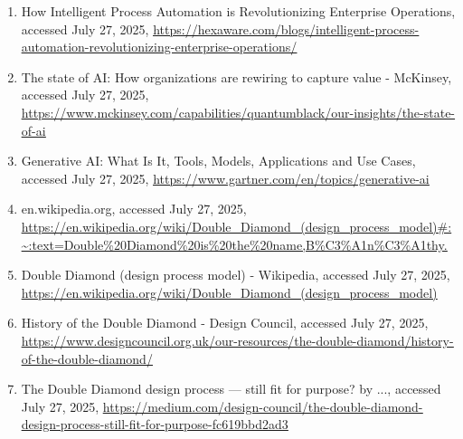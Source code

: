 \documentclass[
  12pt,
  a4paper,
  bibliography=totoc,
  numbers=noenddot
]{scrartcl}
\begin{document}
\begin{enumerate}
  (PDF) The Evolution of Automation in IT Operations: From Basic Scripts
  to AI-Powered Solutions - ResearchGate, accessed July 27, 2025,
  \href{https://www.researchgate.net/publication/388910312_The_Evolution_of_Automation_in_IT_Operations_From_Basic_Scripts_to_AI-Powered_Solutions}{\ul{https://www.researchgate.net/publication/388910312\_The\_Evolution\_of\_Automation\_in\_IT\_Operations\_From\_Basic\_Scripts\_to\_AI-Powered\_Solutions}}
\item
  How Intelligent Process Automation is Revolutionizing Enterprise
  Operations, accessed July 27, 2025,
  \href{https://hexaware.com/blogs/intelligent-process-automation-revolutionizing-enterprise-operations/}{\ul{https://hexaware.com/blogs/intelligent-process-automation-revolutionizing-enterprise-operations/}}
\item
  The state of AI: How organizations are rewiring to capture value -
  McKinsey, accessed July 27, 2025,
  \href{https://www.mckinsey.com/capabilities/quantumblack/our-insights/the-state-of-ai}{\ul{https://www.mckinsey.com/capabilities/quantumblack/our-insights/the-state-of-ai}}
\item
  Generative AI: What Is It, Tools, Models, Applications and Use Cases,
  accessed July 27, 2025,
  \href{https://www.gartner.com/en/topics/generative-ai}{\ul{https://www.gartner.com/en/topics/generative-ai}}
\item
  en.wikipedia.org, accessed July 27, 2025,
  \href{https://en.wikipedia.org/wiki/Double_Diamond_(design_process_model)\#:~:text=Double\%20Diamond\%20is\%20the\%20name,B\%C3\%A1n\%C3\%A1thy.}{\ul{https://en.wikipedia.org/wiki/Double\_Diamond\_(design\_process\_model)\#:\textasciitilde:text=Double\%20Diamond\%20is\%20the\%20name,B\%C3\%A1n\%C3\%A1thy.}}
\item
  Double Diamond (design process model) - Wikipedia, accessed July 27,
  2025,
  \href{https://en.wikipedia.org/wiki/Double_Diamond_(design_process_model)}{\ul{https://en.wikipedia.org/wiki/Double\_Diamond\_(design\_process\_model)}}
\item
  History of the Double Diamond - Design Council, accessed July 27,
  2025,
  \href{https://www.designcouncil.org.uk/our-resources/the-double-diamond/history-of-the-double-diamond/}{\ul{https://www.designcouncil.org.uk/our-resources/the-double-diamond/history-of-the-double-diamond/}}
\item
  The Double Diamond design process --- still fit for purpose?
  \textbar{} by ..., accessed July 27, 2025,
  \href{https://medium.com/design-council/the-double-diamond-design-process-still-fit-for-purpose-fc619bbd2ad3}{\ul{https://medium.com/design-council/the-double-diamond-design-process-still-fit-for-purpose-fc619bbd2ad3}}

\end{enumerate}
\end{document}
